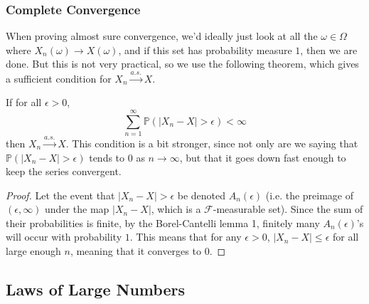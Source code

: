   \subsubsection{Complete Convergence}

    When proving almost sure convergence, we'd ideally just look at all the $\omega \in \Omega$ where $X_n (\omega) \rightarrow X(\omega)$, and if this set has probability measure $1$, then we are done. But this is not very practical, so we use the following theorem, which gives a sufficient condition for $X_n \xrightarrow{a.s.} X$. 

    \begin{theorem}
      If for all $\epsilon > 0$, 
      \begin{equation}
        \sum_{n=1}^\infty \mathbb{P}(|X_n - X| > \epsilon ) < \infty
      \end{equation}
      then $X_n \xrightarrow{a.s.} X$. This condition is a bit stronger, since not only are we saying that $\mathbb{P}(|X_n - X| > \epsilon)$ tends to $0$ as $n \rightarrow \infty$, but that it goes down fast enough to keep the series convergent. 
    \end{theorem}
    \begin{proof}
      Let the event that $|X_n - X| > \epsilon$ be denoted $A_n (\epsilon)$ (i.e. the preimage of $(\epsilon, \infty)$ under the map $|X_n - X|$, which is a $\mathcal{F}$-measurable set). Since the sum of their probabilities is finite, by the Borel-Cantelli lemma 1, finitely many $A_n(\epsilon)$'s will occur with probability $1$. This means that for any $\epsilon > 0$, $|X_n - X| \leq \epsilon$ for all large enough $n$, meaning that it converges to $0$. 
    \end{proof}

\subsection{Laws of Large Numbers}

